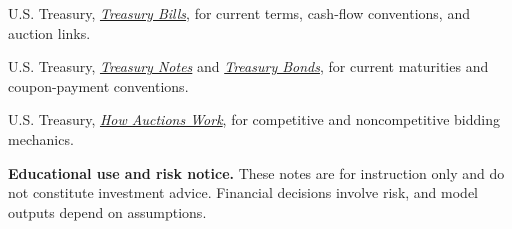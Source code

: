 \documentclass[11pt]{article}
\begin{document}
\begin{readinglist}
  \item U.S. Treasury, \href{https://www.treasurydirect.gov/marketable-securities/treasury-bills/}{\emph{Treasury Bills}}, for current terms, cash-flow conventions, and auction links.
  \item U.S. Treasury, \href{https://www.treasurydirect.gov/marketable-securities/treasury-notes/}{\emph{Treasury Notes}} and \href{https://www.treasurydirect.gov/marketable-securities/treasury-bonds/}{\emph{Treasury Bonds}}, for current maturities and coupon-payment conventions.
  \item U.S. Treasury, \href{https://www.treasurydirect.gov/auctions/how-auctions-work/}{\emph{How Auctions Work}}, for competitive and noncompetitive bidding mechanics.
\end{readinglist}

\vfill
{\sffamily\footnotesize\color{vnmuted}\textbf{Educational use and risk notice.} These notes are for instruction only and do not constitute investment advice. Financial decisions involve risk, and model outputs depend on assumptions.}
\end{document}
